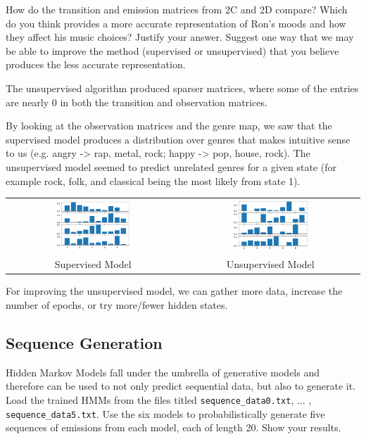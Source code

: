 \problem[5] How do the transition and emission matrices from 2C and 2D compare? Which do you think provides a more accurate representation of Ron's moods and how they affect his music choices? Justify your answer. Suggest one way that we may be able to improve the method (supervised or unsupervised) that you believe produces the less accurate representation. 

\begin{solution}
  The unsupervised algorithm produced sparser matrices, where some of the entries are nearly 0 in both the transition and observation matrices.

  By looking at the observation matrices and the genre map, we saw that the supervised model produces a distribution over genres that makes intuitive sense to us (e.g. angry -> rap, metal, rock; happy -> pop, house, rock).
  The unsupervised model seemed to predict unrelated genres for a given state (for example rock, folk, and classical being the most likely from state 1).

  \begin{tabular}{c c}
    \includegraphics[width=0.45\textwidth]{images/2e_supervised.png} &
    \includegraphics[width=0.45\textwidth]{images/2e_unsupervised.png} \\
    Supervised Model & Unsupervised Model
  \end{tabular}

  For improving the unsupervised model, we can gather more data, increase the number of epochs, or try more/fewer hidden states.
\end{solution}

\subsection{Sequence Generation}
Hidden Markov Models fall under the umbrella of generative models and therefore can be used to not only predict sequential data, but also to generate it. 
\problem[5] Load the trained HMMs from the files titled \texttt{sequence_data0.txt}, $\ldots$ , \texttt{sequence_data5.txt}. Use the six models to probabilistically generate five sequences of emissions from each model, each of length 20. Show your results. 

